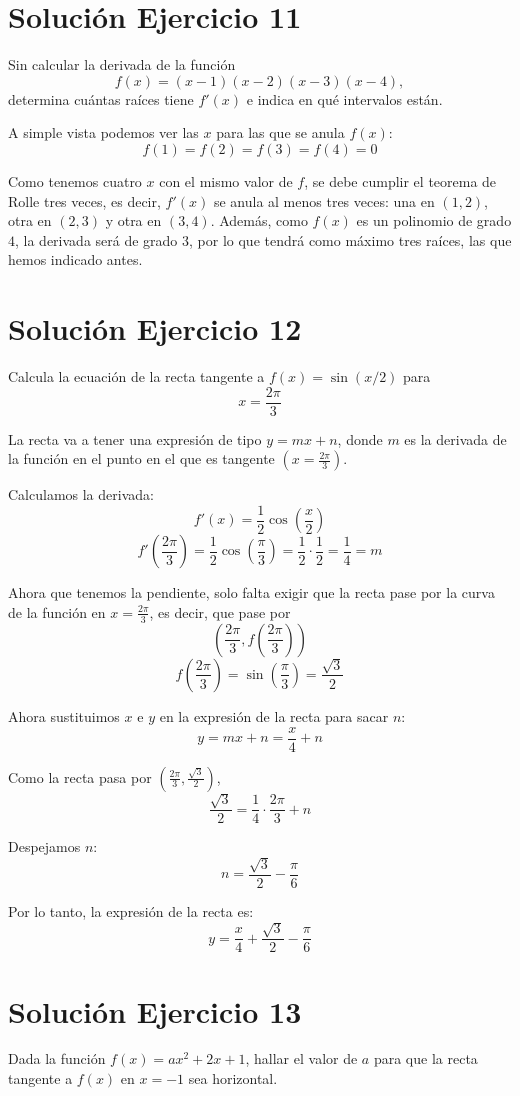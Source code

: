 \documentclass[12pt]{article}
\begin{document}
\section*{Solución Ejercicio 11}
Sin calcular la derivada de la función
\[
f(x)=(x-1)(x-2)(x-3)(x-4),
\]
determina cuántas raíces tiene \(f'(x)\) e indica en qué intervalos están.

A simple vista podemos ver las \(x\) para las que se anula \(f(x)\):
\[
f(1)=f(2)=f(3)=f(4)=0
\]

Como tenemos cuatro \(x\) con el mismo valor de \(f\), se debe cumplir el teorema
de Rolle tres veces, es decir, \(f'(x)\) se anula al menos tres veces: una en \((1,2)\),
otra en \((2,3)\) y otra en \((3,4)\). Además, como \(f(x)\) es un polinomio de grado \(4\),
la derivada será de grado \(3\), por lo que tendrá como máximo tres raíces, las que
hemos indicado antes.

\section*{Solución Ejercicio 12}
Calcula la ecuación de la recta tangente a \(f(x)=\sin(x/2)\) para
\[
x=\frac{2\pi}{3}
\]

La recta va a tener una expresión de tipo \(y=mx+n\), donde \(m\) es la derivada
de la función en el punto en el que es tangente \(\left(x=\frac{2\pi}{3}\right)\).

Calculamos la derivada:
\[
f'(x)=\frac{1}{2}\cos\left(\frac{x}{2}\right)
\]
\[
f'\left(\frac{2\pi}{3}\right)=\frac{1}{2}\cos\left(\frac{\pi}{3}\right)=\frac{1}{2}\cdot \frac{1}{2}=\frac{1}{4}=m
\]

Ahora que tenemos la pendiente, solo falta exigir que la recta pase por la curva
de la función en \(x=\frac{2\pi}{3}\), es decir, que pase por
\[
\left(\frac{2\pi}{3},f\left(\frac{2\pi}{3}\right)\right)
\]
\[
f\left(\frac{2\pi}{3}\right)=\sin\left(\frac{\pi}{3}\right)=\frac{\sqrt{3}}{2}
\]

Ahora sustituimos \(x\) e \(y\) en la expresión de la recta para sacar \(n\):
\[
y=mx+n=\frac{x}{4}+n
\]

Como la recta pasa por \(\left(\frac{2\pi}{3},\frac{\sqrt{3}}{2}\right)\),
\[
\frac{\sqrt{3}}{2}=\frac{1}{4}\cdot \frac{2\pi}{3}+n
\]

Despejamos \(n\):
\[
n=\frac{\sqrt{3}}{2}-\frac{\pi}{6}
\]

Por lo tanto, la expresión de la recta es:
\[
y=\frac{x}{4}+\frac{\sqrt{3}}{2}-\frac{\pi}{6}
\]

\section*{Solución Ejercicio 13}
Dada la función \(f(x)=ax^2+2x+1\), hallar el valor de \(a\) para que la recta tangente a \(f(x)\) en \(x=-1\) sea horizontal.
\end{document}
